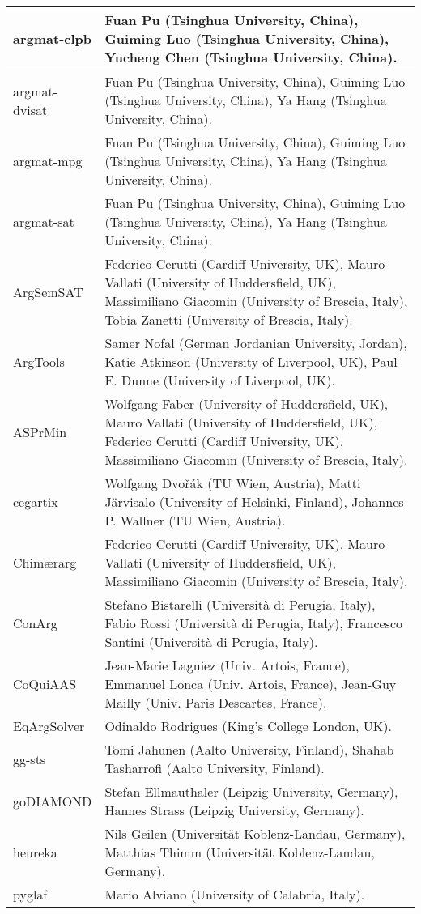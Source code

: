 \begin{center}
\begin{longtable}{| p{} | p{} |}
argmat-clpb   & Fuan Pu (Tsinghua University, China), Guiming Luo (Tsinghua University, China), Yucheng Chen (Tsinghua University, China).                  \\ \midrule
argmat-dvisat & Fuan Pu (Tsinghua University, China), Guiming Luo (Tsinghua University, China), Ya Hang (Tsinghua University, China).                    \\ \hline
argmat-mpg & Fuan Pu (Tsinghua University, China), Guiming Luo (Tsinghua University, China), Ya Hang (Tsinghua University, China).                    \\ \hline
argmat-sat & Fuan Pu (Tsinghua University, China), Guiming Luo (Tsinghua University, China), Ya Hang (Tsinghua University, China).                    \\ \hline
ArgSemSAT  & Federico Cerutti (Cardiff University, UK), Mauro Vallati (University of Huddersfield, UK), Massimiliano Giacomin (University of Brescia, Italy), Tobia Zanetti (University of Brescia, Italy). \\ \hline
ArgTools   & Samer Nofal (German Jordanian University, Jordan), Katie Atkinson (University of Liverpool, UK), Paul E. Dunne (University of Liverpool, UK).              \\ \hline
ASPrMin    & Wolfgang Faber (University of Huddersfield, UK), Mauro Vallati (University of Huddersfield, UK), Federico Cerutti (Cardiff University, UK), Massimiliano Giacomin (University of Brescia, Italy). \\ \hline
cegartix   & Wolfgang Dvořák (TU Wien, Austria), Matti Järvisalo (University of Helsinki, Finland), Johannes P. Wallner (TU Wien, Austria).                 \\ \hline
Chimærarg  & Federico Cerutti (Cardiff University, UK), Mauro Vallati (University of Huddersfield, UK), Massimiliano Giacomin (University of Brescia, Italy).              \\ \hline
ConArg  & Stefano Bistarelli (Università di Perugia, Italy), Fabio Rossi (Università di Perugia, Italy), Francesco Santini (Università di Perugia, Italy).              \\ \hline
CoQuiAAS   & Jean-Marie Lagniez (Univ. Artois, France), Emmanuel Lonca (Univ. Artois, France), Jean-Guy Mailly (Univ. Paris Descartes, France).                \\ \hline
EqArgSolver   & Odinaldo Rodrigues (King's College London, UK).                                       \\ \hline
gg-sts  & Tomi Jahunen (Aalto University, Finland), Shahab Tasharrofi (Aalto University, Finland).                            \\ \hline
goDIAMOND  & Stefan Ellmauthaler (Leipzig University, Germany), Hannes Strass (Leipzig University, Germany).                           \\ \hline
heureka    & Nils Geilen (Universität Koblenz-Landau, Germany), Matthias Thimm (Universität Koblenz-Landau, Germany).                        \\ \hline
pyglaf  & Mario Alviano (University of Calabria, Italy).                                       
\end{longtable}
\end{center}
